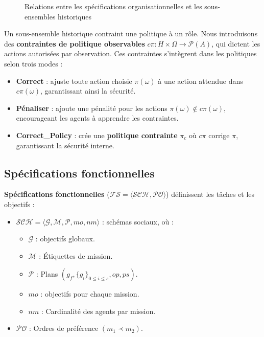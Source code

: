 \begin{figure}[h!]
    \centering
    
    \caption{Relations entre les spécifications organisationnelles et les sous-ensembles historiques}
    \label{fig:PRAHOM_osm_rels}
\end{figure}

Un sous-ensemble historique contraint une politique à un rôle. Nous introduisons des \textbf{contraintes de politique observables} $c\pi: H \times \Omega \rightarrow \mathcal{P}(A)$, qui dictent les actions autorisées par observation. Ces contraintes s'intègrent dans les politiques selon trois modes :
\begin{itemize}
    \item \textbf{Correct} : ajuste toute action choisie $\pi(\omega)$ à une action attendue dans $c\pi(\omega)$, garantissant ainsi la sécurité.
    \item \textbf{Pénaliser} : ajoute une pénalité pour les actions $\pi(\omega) \notin c\pi(\omega)$, encourageant les agents à apprendre les contraintes.
    \item \textbf{Correct\_Policy} : crée une \textbf{politique contrainte} $\pi_c$ où $c\pi$ corrige $\pi$, garantissant la sécurité interne.
\end{itemize}

\subsection{Spécifications fonctionnelles}

\textbf{Spécifications fonctionnelles} ($\mathcal{FS} = \langle \mathcal{SCH}, \mathcal{PO} \rangle$) définissent les tâches et les objectifs :
\begin{itemize}
    \item $\mathcal{SCH} = \langle \mathcal{G}, \mathcal{M}, \mathcal{P}, mo, nm \rangle$ : schémas sociaux, où :
          \begin{itemize}
              \item $\mathcal{G}$ : objectifs globaux.
              \item $\mathcal{M}$ : Étiquettes de mission.
              \item $\mathcal{P}$ : Plans $(g_f, \{g_i\}_{0 \leq i \leq s}, op, ps)$.
              \item $mo$ : objectifs pour chaque mission.
              \item $nm$ : Cardinalité des agents par mission.
          \end{itemize}
    \item $\mathcal{PO}$ : Ordres de préférence $(m_1 \prec m_2)$.
\end{itemize}

